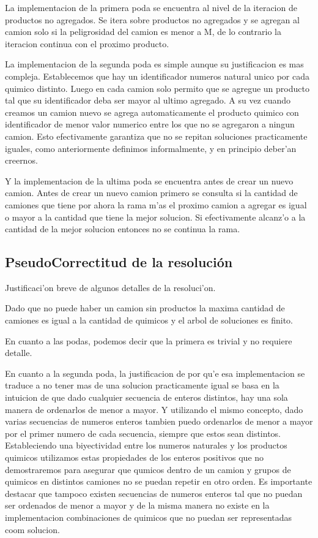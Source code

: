 La implementacion de la primera poda se encuentra al nivel de la iteracion de productos no agregados. Se itera sobre productos no agregados y se agregan al camion solo si la peligrosidad del camion es menor a M, de lo contrario la iteracion continua con el proximo producto.

La implementacion de la segunda poda es simple aunque su justificacion es mas compleja. Establecemos que hay un identificador numeros natural unico por cada quimico distinto. Luego en cada camion solo permito que se agregue un producto tal que su identificador deba ser mayor al ultimo agregado. A su vez cuando creamos un camion nuevo se agrega automaticamente el producto quimico con identificador de menor valor numerico entre los que no se agregaron a ningun camion. Esto efectivamente garantiza que no se repitan soluciones practicamente iguales, como anteriormente definimos informalmente, y en principio deber'an creernos.


Y la implementacion de la ultima poda se encuentra antes de crear un nuevo camion. Antes de crear un nuevo camion primero se consulta si la cantidad de camiones que tiene por ahora la rama m'as el proximo camion a agregar es igual o mayor a la cantidad que tiene la mejor solucion. Si efectivamente alcanz'o a la cantidad de la mejor solucion entonces no se continua la rama.
 


\subsection{PseudoCorrectitud de la resoluci\'on}


Justificaci'on breve de algunos detalles de la resoluci'on.

Dado que no puede haber un camion sin productos la maxima cantidad de camiones es igual a la cantidad de quimicos y el arbol de soluciones es finito.


En cuanto a las podas, podemos decir que la primera es trivial y no requiere detalle.

En cuanto a la segunda poda, la justificacion de por qu'e esa implementacion se traduce a no tener mas de una solucion practicamente igual se basa en la intuicion de que dado cualquier secuencia de enteros distintos, hay una sola manera de ordenarlos de menor a mayor. Y utilizando el mismo concepto, dado varias secuencias de numeros enteros tambien puedo ordenarlos de menor a mayor por el primer numero de cada secuencia, siempre que estos sean distintos. 
Estableciendo una biyectividad entre los numeros naturales y los productos quimicos utilizamos estas propiedades de los enteros positivos que no demostraremos para asegurar que qumicos dentro de un camion y grupos de quimicos en distintos camiones no se puedan repetir en otro orden.
Es importante destacar que tampoco existen secuencias de numeros enteros tal que no puedan ser ordenados de menor a mayor y de la misma manera no existe en la implementacion combinaciones de quimicos que no puedan ser representadas coom solucion. 

